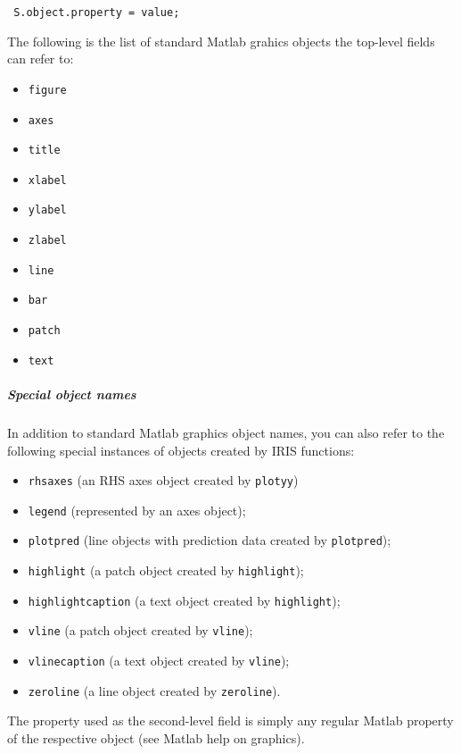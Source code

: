  \begin{verbatim}
 S.object.property = value;
 \end{verbatim}
 
 The following is the list of standard Matlab grahics objects the
 top-level fields can refer to:
 
 \begin{itemize}
 \item
   \texttt{figure}
 \item
   \texttt{axes}
 \item
   \texttt{title}
 \item
   \texttt{xlabel}
 \item
   \texttt{ylabel}
 \item
   \texttt{zlabel}
 \item
   \texttt{line}
 \item
   \texttt{bar}
 \item
   \texttt{patch}
 \item
   \texttt{text}
 \end{itemize}
 
 \subparagraph{Special object names}
 
 In addition to standard Matlab graphics object names, you can also refer
 to the following special instances of objects created by IRIS functions:
 
 \begin{itemize}
 \item
   \texttt{rhsaxes} (an RHS axes object created by \texttt{plotyy})
 \item
   \texttt{legend} (represented by an axes object);
 \item
   \texttt{plotpred} (line objects with prediction data created by
   \texttt{plotpred});
 \item
   \texttt{highlight} (a patch object created by \texttt{highlight});
 \item
   \texttt{highlightcaption} (a text object created by
   \texttt{highlight});
 \item
   \texttt{vline} (a patch object created by \texttt{vline});
 \item
   \texttt{vlinecaption} (a text object created by \texttt{vline});
 \item
   \texttt{zeroline} (a line object created by \texttt{zeroline}).
 \end{itemize}
 
 The property used as the second-level field is simply any regular Matlab
 property of the respective object (see Matlab help on graphics).
 
